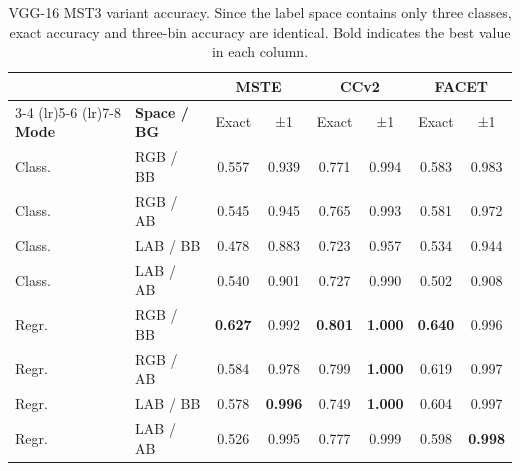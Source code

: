 \begin{table}[H]
	\centering
	\footnotesize
	\begin{tabular}{llcccccc}
		\toprule
		              &                     & \multicolumn{2}{c}{\textbf{MSTE}} & \multicolumn{2}{c}{\textbf{CCv2}} & \multicolumn{2}{c}{\textbf{FACET}}                                                    \\
		\cmidrule(lr){3-4} \cmidrule(lr){5-6} \cmidrule(lr){7-8}
		\textbf{Mode} & \textbf{Space / BG} & Exact                             & ±1                                & Exact                              & ±1             & Exact          & ±1             \\
		\midrule
		Class.        & RGB / BB            & 0.557                             & 0.939                             & 0.771                              & 0.994          & 0.583          & 0.983          \\
		Class.        & RGB / AB            & 0.545                             & 0.945                             & 0.765                              & 0.993          & 0.581          & 0.972          \\
		Class.        & LAB / BB            & 0.478                             & 0.883                             & 0.723                              & 0.957          & 0.534          & 0.944          \\
		Class.        & LAB / AB            & 0.540                             & 0.901                             & 0.727                              & 0.990          & 0.502          & 0.908          \\
		Regr.         & RGB / BB            & \textbf{0.627}                    & 0.992                             & \textbf{0.801}                     & \textbf{1.000} & \textbf{0.640} & 0.996          \\
		Regr.         & RGB / AB            & 0.584                             & 0.978                             & 0.799                              & \textbf{1.000} & 0.619          & 0.997          \\
		Regr.         & LAB / BB            & 0.578                             & \textbf{0.996}                    & 0.749                              & \textbf{1.000} & 0.604          & 0.997          \\
		Regr.         & LAB / AB            & 0.526                             & 0.995                             & 0.777                              & 0.999          & 0.598          & \textbf{0.998} \\
		\bottomrule
	\end{tabular}
	\caption{VGG-16 MST3 variant accuracy. Since the label space contains only three
		classes, exact accuracy and three-bin accuracy are identical. Bold indicates the
		best value in each column.}
	\label{tab:vgg16_mst3}
\end{table}

